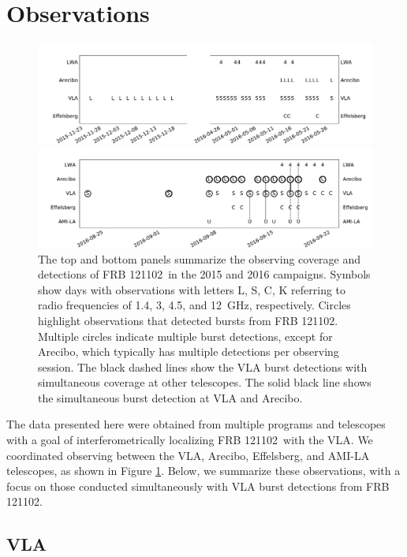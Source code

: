 \documentclass[twocolumn]{aastex61}
\newcommand{\frb}{FRB 121102}
\begin{document}
\section{Observations}
\label{sec:obs}
\begin{figure}[t]
\begin{center}
\includegraphics[width=2\columnwidth]{timeline0}

\includegraphics[width=2\columnwidth]{timeline}
\caption{The top and bottom panels summarize the observing coverage and detections of \frb\ in the 2015 and 2016 campaigns. Symbols show days with observations with letters L, S, C, K referring to radio frequencies of 1.4, 3, 4.5, and 12~GHz, respectively. Circles highlight observations that detected bursts from \frb. Multiple circles indicate multiple burst detections, except for Arecibo, which typically has multiple detections per observing session. The black dashed lines show the VLA burst detections with simultaneous coverage at other telescopes. The solid black line shows the simultaneous burst detection at VLA and Arecibo.
\label{fig:sched}}
\end{center}
\end{figure}

The data presented here were obtained from multiple programs and telescopes with a goal of interferometrically localizing \frb\ with the VLA. We coordinated observing between the VLA, Arecibo, Effelsberg, and AMI-LA telescopes, as shown in Figure \ref{fig:sched}. Below, we summarize these observations, with a focus on those conducted simultaneously with VLA burst detections from \frb.

\subsection{VLA}
\end{document}
